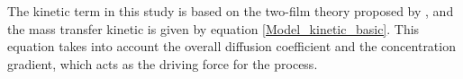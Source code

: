 \documentclass[../Article_Model_Parameters.tex]{subfiles}
\begin{document}
	
	The kinetic term in this study is based on the two-film theory proposed by \citet{Reverchon1996}, and the mass transfer kinetic is given by equation \ref{Model_kinetic_basic}. This equation takes into account the overall diffusion coefficient and the concentration gradient, which acts as the driving force for the process.
	
	
\end{document}
